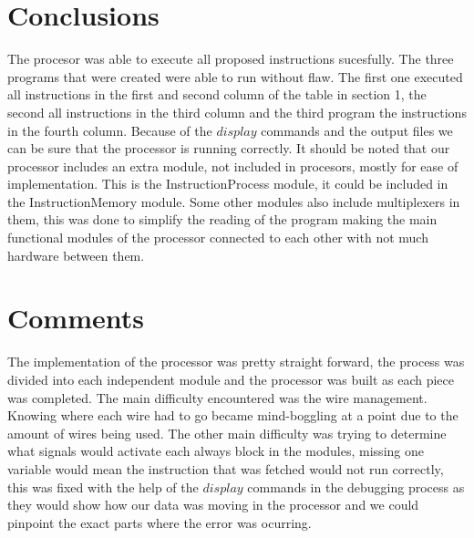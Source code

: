 \documentclass[12pt,a4paper]{article}
\begin{document}
\section{Conclusions}
The procesor was able to execute all proposed instructions sucesfully. The three programs that were created were able to run without flaw. The first one executed all instructions in the first and second column of the table in section 1, the second all instructions in the third column and the third program the instructions in the fourth column. Because of the $display$ commands and the output files we can be sure that the processor is running correctly. It should be noted that our processor includes an extra module, not included in procesors, mostly for ease of implementation. This is the InstructionProcess module, it could be included in the InstructionMemory module. Some other modules also include multiplexers in them, this was done to simplify the reading of the program making the main functional modules of the processor connected to each other with not much hardware between them.

\section{Comments}
The implementation of the processor was pretty straight forward, the process was divided into each independent module and the processor was built as each piece was completed. The main difficulty encountered was the wire management. Knowing where each wire had to go became mind-boggling at a point due to the amount of wires being used. The other main difficulty was trying to determine what signals would activate each always block in the modules, missing one variable would mean the instruction that was fetched would not run correctly, this was fixed with the help of the $display$ commands in the debugging process as they would show how our data was moving in the processor and we could pinpoint the exact parts where the error was ocurring.
\end{document}
